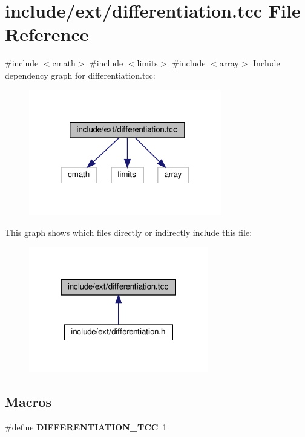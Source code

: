 \hypertarget{differentiation_8tcc}{}\section{include/ext/differentiation.tcc File Reference}
\label{differentiation_8tcc}
{\ttfamily \#include $<$cmath$>$}\newline
{\ttfamily \#include $<$limits$>$}\newline
{\ttfamily \#include $<$array$>$}\newline
Include dependency graph for differentiation.\+tcc\+:\nopagebreak
\begin{figure}[H]
\begin{center}
\leavevmode
\includegraphics[width=238pt]{differentiation_8tcc__incl}
\end{center}
\end{figure}
This graph shows which files directly or indirectly include this file\+:\nopagebreak
\begin{figure}[H]
\begin{center}
\leavevmode
\includegraphics[width=222pt]{differentiation_8tcc__dep__incl}
\end{center}
\end{figure}
\subsection*{Macros}
\begin{DoxyCompactItemize}
\item 
\mbox{\label{differentiation_8tcc_aba2d54628bdc01e26d172ef294c3e0f8}} 
\#define {\bfseries D\+I\+F\+F\+E\+R\+E\+N\+T\+I\+A\+T\+I\+O\+N\+\_\+\+T\+CC}~1
\end{DoxyCompactItemize}
